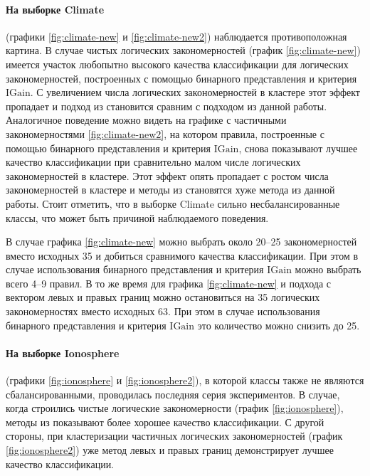 \documentclass[12pt]{article}
\begin{document}
\paragraph{На выборке Climate}\label{par:clima}
(графики \ref{fig:climate-new} и \ref{fig:climate-new2}) наблюдается
противоположная картина. В случае чистых логических закономерностей
(график \ref{fig:climate-new}) имеется участок любопытно высокого
качества классификации для логических закономерностей, построенных с
помощью бинарного представления и критерия \(\text{IGain}\). С
увеличением числа логических закономерностей в кластере этот эффект
пропадает и подход из \cite{novikov15} становится сравним с подходом
из данной работы. Аналогичное поведение можно видеть на графике с
частичными закономерностями \ref{fig:climate-new2}, на котором
правила, построенные с помощью бинарного представления и критерия
\(\text{IGain}\), снова показывают лучшее качество классификации при
сравнительно малом числе логических закономерностей в кластере. Этот
эффект опять пропадает с ростом числа закономерностей в кластере и
методы из \cite{novikov15} становятся хуже метода из данной
работы. Стоит отметить, что в выборке Climate сильно
несбалансированные классы, что может быть причиной наблюдаемого
поведения.

В случае графика \ref{fig:climate-new} можно выбрать около 20--25
закономерностей вместо исходных 35 и добиться сравнимого качества
классификации. При этом в случае использования бинарного представления
и критерия \(\text{IGain}\) можно выбрать всего 4--9 правил. В то же
время для графика \ref{fig:climate-new} и подхода с вектором левых и
правых границ можно остановиться на 35 логических закономерностях
вместо исходных 63. При этом в случае использования бинарного
представления и критерия \(\text{IGain}\) это количество можно снизить
до 25.

\paragraph{На выборке Ionosphere}\label{par:ion}
(графики \ref{fig:ionosphere} и \ref{fig:ionosphere2}), в которой
классы также не являются сбалансированными, проводилась последняя
серия экспериментов. В случае, когда строились чистые логические
закономерности (график \ref{fig:ionosphere}), методы из
\cite{novikov15} показывают более хорошее качество классификации. С
другой стороны, при кластеризации частичных логических закономерностей
(график \ref{fig:ionosphere2}) уже метод левых и правых границ
демонстрирует лучшее качество классификации.
\end{document}
